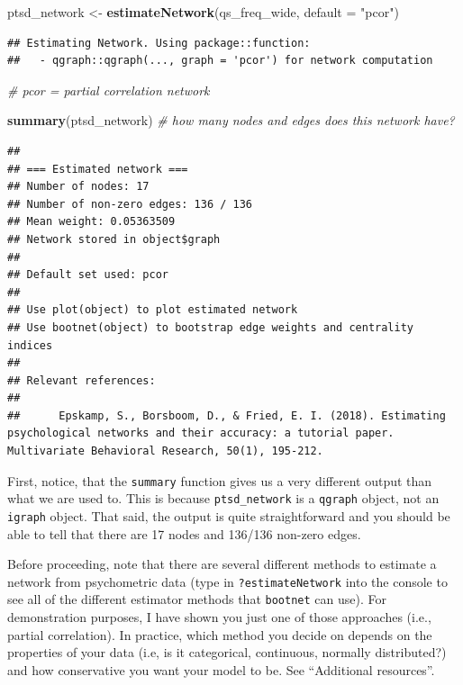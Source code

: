 \documentclass[
]{book}
\newenvironment{Shaded}{\begin{snugshade}}{\end{snugshade}}
\newcommand{\AttributeTok}[1]{\textcolor[rgb]{0.13,0.29,0.53}{#1}}
\newcommand{\CommentTok}[1]{\textcolor[rgb]{0.56,0.35,0.01}{\textit{#1}}}
\newcommand{\FunctionTok}[1]{\textcolor[rgb]{0.13,0.29,0.53}{\textbf{#1}}}
\newcommand{\NormalTok}[1]{#1}
\newcommand{\OtherTok}[1]{\textcolor[rgb]{0.56,0.35,0.01}{#1}}
\newcommand{\StringTok}[1]{\textcolor[rgb]{0.31,0.60,0.02}{#1}}
\begin{document}
\begin{Shaded}
\begin{Highlighting}[]
\NormalTok{ptsd\_network }\OtherTok{\textless{}{-}} \FunctionTok{estimateNetwork}\NormalTok{(qs\_freq\_wide, }\AttributeTok{default =} \StringTok{"pcor"}\NormalTok{) }
\end{Highlighting}
\end{Shaded}

\begin{verbatim}
## Estimating Network. Using package::function:
##   - qgraph::qgraph(..., graph = 'pcor') for network computation
\end{verbatim}

\begin{Shaded}
\begin{Highlighting}[]
\CommentTok{\# pcor = partial correlation network}

\FunctionTok{summary}\NormalTok{(ptsd\_network) }\CommentTok{\# how many nodes and edges does this network have?}
\end{Highlighting}
\end{Shaded}

\begin{verbatim}
## 
## === Estimated network ===
## Number of nodes: 17 
## Number of non-zero edges: 136 / 136 
## Mean weight: 0.05363509 
## Network stored in object$graph 
##  
## Default set used: pcor 
##  
## Use plot(object) to plot estimated network 
## Use bootnet(object) to bootstrap edge weights and centrality indices 
## 
## Relevant references:
## 
##      Epskamp, S., Borsboom, D., & Fried, E. I. (2018). Estimating psychological networks and their accuracy: a tutorial paper. Multivariate Behavioral Research, 50(1), 195-212.
\end{verbatim}

First, notice, that the \texttt{summary} function gives us a very different output than what we are used to. This is because \texttt{ptsd\_network} is a \texttt{qgraph} object, not an \texttt{igraph} object. That said, the output is quite straightforward and you should be able to tell that there are 17 nodes and 136/136 non-zero edges.

Before proceeding, note that there are several different methods to estimate a network from psychometric data (type in \texttt{?estimateNetwork} into the console to see all of the different estimator methods that \texttt{bootnet} can use). For demonstration purposes, I have shown you just one of those approaches (i.e., partial correlation). In practice, which method you decide on depends on the properties of your data (i.e, is it categorical, continuous, normally distributed?) and how conservative you want your model to be. See ``Additional resources''.
\end{document}
